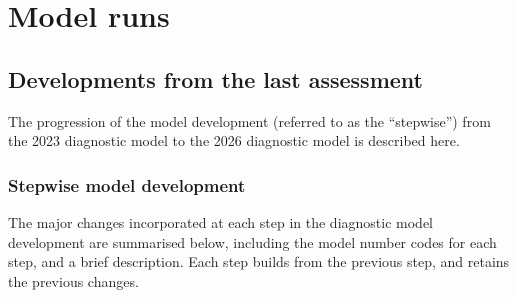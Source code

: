 \documentclass[
  english,
  a4paper,
  a4paper,
  11pt]{SCreport}
\begin{document}
\section{Model runs}\label{model-runs}

\subsection{Developments from the last assessment}\label{sec-stepwise}

The progression of the model development (referred to as the
``stepwise'') from the 2023 diagnostic model to the 2026 diagnostic
model is described here.

\subsubsection{Stepwise model
development}\label{stepwise-model-development}

The major changes incorporated at each step in the diagnostic model
development are summarised below, including the model number codes for
each step, and a brief description. Each step builds from the previous
step, and retains the previous changes.
\end{document}
